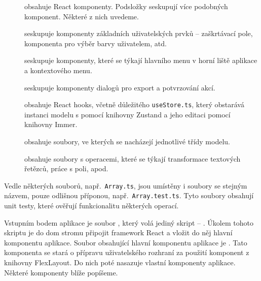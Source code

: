 \begin{description}
  \item[] obsahuje React komponenty.
    Podsložky seskupují více podobných komponent.
    Některé z nich uvedeme.
  \item[] seskupuje komponenty základních uživatelských prvků -- zaškrtávací pole, komponenta pro výběr barvy uživatelem, atd.
  \item[] seskupuje komponenty, které se týkají hlavního menu v horní liště aplikace a kontextového menu.
  \item[] seskupuje komponenty dialogů pro export a potvrzování akcí.
  \item[] obsahuje React hooks, včetně důležitého \texttt{useStore.ts}, který obstarává instanci modelu s pomocí knihovny Zustand a jeho editaci pomocí knihovny Immer.
  \item[] obsahuje soubory, ve kterých se nacházejí jednotlivé třídy modelu.
  \item[] obsahuje soubory s operacemi, které se týkají transformace textových řetězců, práce s poli, apod.
\end{description}

Vedle některých souborů, např.~\texttt{Array.ts}, jsou umístěny i soubory se stejným názvem, pouze odlišnou příponou, např.~\texttt{Array.test.ts}.
Tyto soubory obsahují unit testy, které ověřují funkcionalitu některých operací.

Vstupním bodem aplikace je soubor , který volá jediný skript -- .
Úkolem tohoto skriptu je do \acrshort{dom} stromu připojit framework React a vložit do něj hlavní komponentu aplikace.
Soubor obsahující hlavní komponentu aplikace je .
Tato komponenta se stará o přípravu uživatelského rozhraní za použití komponent z knihovny FlexLayout.
Do nich poté nasazuje vlastní komponenty aplikace.
Některé komponenty blíže popíšeme.

